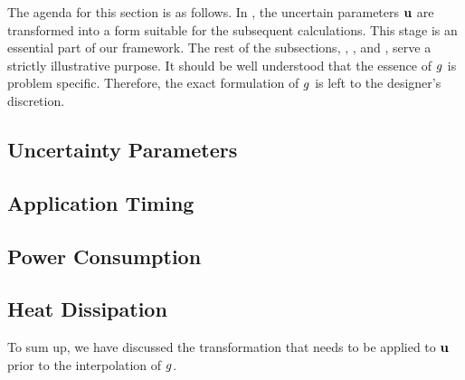 The agenda for this section is as follows. In , the uncertain
parameters $\mathbf{u}$ are transformed into a form suitable for the subsequent
calculations. This stage is an essential part of our framework. The rest of the
subsections, , , and , serve a strictly
illustrative purpose.  It should
be well understood that the essence of $g$ is problem specific. Therefore, the
exact formulation of $g$ is left to the designer's discretion.

\subsection{Uncertainty Parameters} 



\subsection{Application Timing} 


\subsection{Power Consumption} 


\subsection{Heat Dissipation} 


To sum up, we have discussed the transformation that needs to be applied to
$\mathbf{u}$ prior to the interpolation of $g$. 


